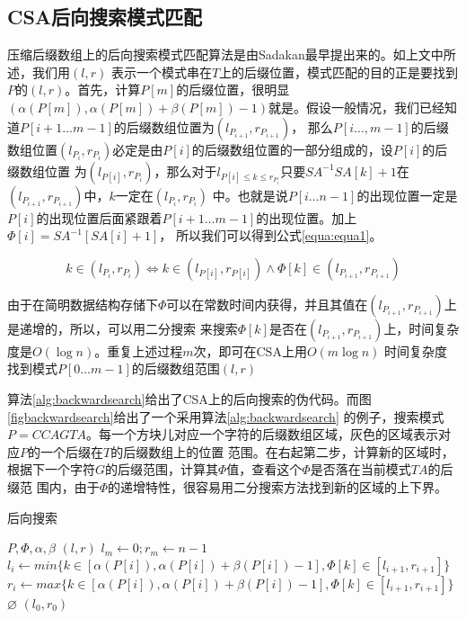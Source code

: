 \subsection{CSA后向搜索模式匹配}
压缩后缀数组上的后向搜索模式匹配算法是由Sadakan最早提出来的\cite{sadakane2002succinct}。如上文中所述，我们用$(l,r)$
表示一个模式串在$T$上的后缀位置，模式匹配的目的正是要找到$P$的$(l,r)$。首先，计算$P[m]$的后缀位置，很明显$(\alpha(P[m]),
\alpha(P[m])+\beta(P[m])-1)$就是。假设一般情况，我们已经知道$P[i+1\ldots m-1]$的后缀数组位置为$(l_{P_{i+1}},r_{P_{i+1}})$，
那么$P[i\ldots,m-1]$的后缀数组位置$(l_{P_i},r_{P_i})$必定是由$P[i]$的后缀数组位置的一部分组成的，设$P[i]$的后缀数组位置
为$(l_{P[i]},r_{P_i})$，那么对于$l_{P[i]\leq k \leq r_{P_i}}$只要$SA^{-1}SA[k]+1$在$(l_{P_{i+1}},r_{P_{i+1}})$中，$k$一定在$(l_{P_i},r_{P_i})$
中。也就是说$P[i\ldots n-1]$的出现位置一定是$P[i]$的出现位置后面紧跟着$P[i+1\ldots m-1]$的出现位置。加上$\Phi[i]=SA^{-1}[SA[i]+1]$，
所以我们可以得到公式\ref{equa:equa1}。

\begin{equation}\label{equa:equa1}
    k \in (l_{P_i},r_{P_i}) \iff k \in (l_{P[i]},r_{P[i]}) \wedge \Phi[k] \in (l_{P_{i+1}},r_{P_{i+1}})
\end{equation}

由于在简明数据结构存储下$\Phi$可以在常数时间内获得，并且其值在$(l_{P_{i+1}},r_{P_{i+1}})$上是递增的，所以，可以用二分搜索
来搜索$\Phi[k]$是否在$(l_{P_{i+1}},r_{P_{i+1}})$上，时间复杂度是$O(\log n)$。重复上述过程$m$次，即可在CSA上用$O(m\log n)$
时间复杂度找到模式$P[0\ldots m-1]$的后缀数组范围$(l,r)$

算法\ref{alg:backwardsearch}给出了CSA上的后向搜索的伪代码。而图\ref{figbackwardsearch}给出了一个采用算法\ref{alg:backwardsearch}
的例子，搜索模式$P=CCAGTA$。每一个方块儿对应一个字符的后缀数组区域，灰色的区域表示对应$P$的一个后缀在$T$的后缀数组上的位置
范围。在右起第二步，计算新的区域时，根据下一个字符$G$的后缀范围，计算其$\Phi$值，查看这个$\Phi$是否落在当前模式$TA$的后缀范
围内，由于$\Phi$的递增特性，很容易用二分搜索方法找到新的区域的上下界。

\begin{algorithm}
    \caption{后向搜索}
    \label{alg:backwardsearch}
    \begin{algorithmic}[1]
        \Require $P,\Phi,\alpha,\beta$
        \Ensure $(l,r)$
        \State $l_{m} \gets 0;r_{m}\gets n-1$
            \State $l_i \gets min\{ k \in [\alpha(P[i]),\alpha(P[i])+\beta(P[i])-1],\Phi[k] \in [l_{i+1},r_{i+1}]\}$
            \State $r_i \gets max\{ k \in [\alpha(P[i]),\alpha(P[i])+\beta(P[i])-1],\Phi[k] \in [l_{i+1},r_{i+1}]\}$
                \State \Return $\varnothing$
            \EndIf
        \EndFor
        \State \Return $(l_0,r_0)$
        \EndFunction
    \end{algorithmic}
\end{algorithm}


